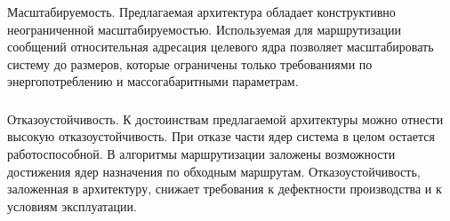 \subsubsection{}
Масштабируемость. Предлагаемая архитектура обладает конструктивно
неограниченной масштабируемостью. Используемая для маршрутизации сообщений
относительная адресация целевого ядра позволяет масштабировать систему до
размеров, которые ограничены только требованиями по энергопотреблению и
массогабаритными параметрам.

\subsubsection{}
Отказоустойчивость. К достоинствам предлагаемой архитектуры можно
отнести высокую отказоустойчивость. При отказе части ядер система в целом
остается работоспособной. В алгоритмы маршрутизации заложены возможности
достижения ядер назначения по обходным маршрутам. Отказоустойчивость,
заложенная в архитектуру, снижает требования к дефектности производства
и к условиям эксплуатации.

